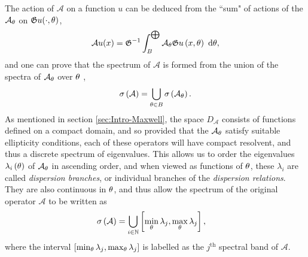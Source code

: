 The action of $\mathcal{A}$ on a function $u$ can be deduced from the ``sum" of actions of the $\mathcal{A}_{\theta}$ on $\mathfrak{G} u(\cdot,\theta)$,
\begin{align} \label{eq:GelfandDirectIntegral}
	\mathcal{A}u(x) = \mathfrak{G}^{-1}\int_{B}^{\bigoplus}\mathcal{A}_{\theta}\mathfrak{G} u\left( x,\theta \right) \ \mathrm{d}\theta,
\end{align}
and one can prove that the spectrum of $\mathcal{A}$ is formed from the union of the spectra of $\mathcal{A}_{\theta}$ over $\theta$ , 
\begin{align*}
	\sigma\left( \mathcal{A} \right) = \bigcup_{\theta\in B}\sigma\left( \mathcal{A}_{\theta} \right).
\end{align*}
As mentioned in section \ref{sec:Intro-Maxwell}, the space $D_{\mathcal{A}}$ consists of functions defined on a compact domain, and so provided that the $\mathcal{A}_{\theta}$ satisfy suitable ellipticity conditions, each of these operators will have compact resolvent, and thus a discrete spectrum of eigenvalues.
This allows us to order the eigenvalues $\lambda_i\left( \theta \right)$ of $\mathcal{A}_{\theta}$ in ascending order, and when viewed as functions of $\theta$, these $\lambda_i$ are called \emph{dispersion branches}, or individual branches of the \emph{dispersion relations}.
They are also continuous in $\theta$, and thus allow the spectrum of the original operator $\mathcal{A}$ to be written as
\begin{align*}
	\sigma\left( \mathcal{A} \right) &= \bigcup_{i\in\mathbb{N}}\left[  \min_{\theta}\lambda_j, \max_{\theta}\lambda_j  \right],
\end{align*}
where the interval $\left[  \min_{\theta}\lambda_j, \max_{\theta}\lambda_j  \right]$ is labelled as the $j^{\text{th}}$ spectral band of $\mathcal{A}$.


